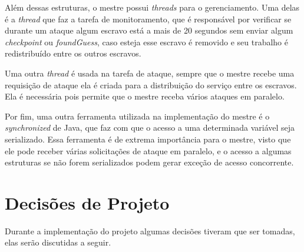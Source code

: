 \documentclass[
	12pt,				%
    oneside,			%
	a4paper,			%
	english,			%
	brazil,				%
	]{abntex2}
\begin{document}
Além dessas estruturas, o mestre possui \textit{threads} para o gerenciamento. Uma delas é a \textit{thread} que faz a tarefa
de monitoramento, que é responsável por verificar se durante um ataque algum escravo está a mais de 20 segundos sem enviar
algum \textit{checkpoint} ou \textit{foundGuess}, caso esteja esse escravo é removido e seu trabalho é redistribuído entre os
outros escravos.

Uma outra \textit{thread} é usada na tarefa de ataque, sempre que o mestre recebe uma requisição de ataque ela é criada para 
a distribuição do serviço entre os escravos. Ela é necessária pois permite que o mestre receba vários ataques em paralelo.

Por fim, uma outra ferramenta utilizada na implementação do mestre é o \textit{synchronized} de Java, que faz com que o acesso
a uma determinada variável seja serializado. Essa ferramenta é de extrema importância para o mestre, visto que ele pode
receber várias solicitações de ataque em paralelo, e o acesso a algumas estruturas se não forem serializados podem gerar
exceção de acesso concorrente.


\section{Decisões de Projeto}
Durante a implementação do projeto algumas decisões tiveram que ser tomadas, elas serão discutidas a seguir.
\end{document}
